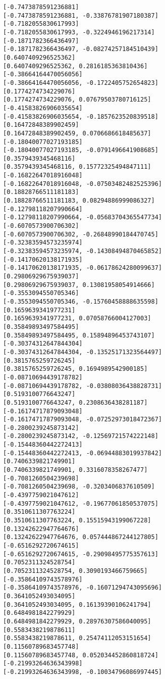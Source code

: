 \documentclass[11pt]{article}
\begin{document}
\begin{Verbatim}[commandchars=\\\{\}]
[-0.7473878591236881]
[-0.7473878591236881, -0.33876781907180387]
[-0.7182055830617993]
[-0.7182055830617993, -0.3224946196217314]
[-0.1871782366436497]
[-0.1871782366436497, -0.08274257184510439]
[0.6407409296525362]
[0.6407409296525362, 0.2816185363810436]
[-0.38664164470056056]
[-0.38664164470056056, -0.1722405752654823]
[0.1774274734229076]
[0.1774274734229076, 0.07679503780716125]
[-0.41583826906035654]
[-0.41583826906035654, -0.1857623520839518]
[0.16472848389902459]
[0.16472848389902459, 0.0706686618485637]
[-0.18040077027193185]
[-0.18040077027193185, -0.0791496641908685]
[0.3579439345468116]
[0.3579439345468116, 0.15772325494847111]
[-0.16822647018916048]
[-0.16822647018916048, -0.07503482482525396]
[0.18828766511181183]
[0.18828766511181183, 0.08294886999086327]
[-0.12798118207990664]
[-0.12798118207990664, -0.05683704365547734]
[-0.6070573900706302]
[-0.6070573900706302, -0.26848990184470745]
[-0.32383594573235974]
[-0.32383594573235974, -0.14308494870465852]
[-0.14170620138171935]
[-0.14170620138171935, -0.06178624280099637]
[0.29806929675939037]
[0.29806929675939037, 0.13081958054914666]
[-0.3553094550705346]
[-0.3553094550705346, -0.15760458888635598]
[0.1659639341977231]
[0.1659639341977231, 0.07058766004127003]
[0.35849893497584495]
[0.35849893497584495, 0.15894896453743107]
[-0.30374312647844304]
[-0.30374312647844304, -0.13525171323564497]
[0.3815765259726245]
[0.3815765259726245, 0.1694989542900185]
[-0.08710694439178782]
[-0.08710694439178782, -0.03808036438828731]
[0.5193100776643247]
[0.5193100776643247, 0.2308636438281187]
[-0.16174717879093048]
[-0.16174717879093048, -0.07252973018472367]
[-0.2800239245873142]
[-0.2800239245873142, -0.12569721574222148]
[-0.15448360442272413]
[-0.15448360442272413, -0.06944883019937842]
[0.7406339821749901]
[0.7406339821749901, 0.3316078358267477]
[-0.7081260504239698]
[-0.7081260504239698, -0.3203406837610509]
[-0.4397759021047612]
[-0.4397759021047612, -0.19677061850537075]
[0.3510611307763224]
[0.3510611307763224, 0.15515943199067228]
[0.13242622947764676]
[0.13242622947764676, 0.057444867244127805]
[-0.6516292720674615]
[-0.6516292720674615, -0.29098495775357613]
[0.7052311324528754]
[0.7052311324528754, 0.3090193466759665]
[-0.35864109743578976]
[-0.35864109743578976, -0.16071294743095696]
[0.3641052493034095]
[0.3641052493034095, 0.16139390106241794]
[0.6484981842279929]
[0.6484981842279929, 0.28976307586040095]
[0.5583438219878611]
[0.5583438219878611, 0.25474112053151654]
[0.11560789683457748]
[0.11560789683457748, 0.052034452860818724]
[-0.21993264636343998]
[-0.21993264636343998, -0.10034796086997445]

\end{Verbatim}
\end{document}
